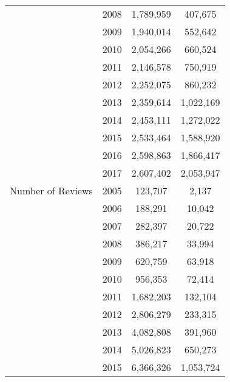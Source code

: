 \begin{table}[!htbp]
{\begin{tabular}{lccc}
                 & 2008                 & 1,789,959            & 407,675              \\
                 & 2009                 & 1,940,014            & 552,642              \\
                 & 2010                 & 2,054,266            & 660,524              \\
                 & 2011                 & 2,146,578            & 750,919              \\
                 & 2012                 & 2,252,075            & 860,232              \\
                 & 2013                 & 2,359,614            & 1,022,169            \\
                 & 2014                 & 2,453,111            & 1,272,022            \\
                 & 2015                 & 2,533,464            & 1,588,920            \\
                 & 2016                 & 2,598,863            & 1,866,417            \\
                 & 2017                 & 2,607,402            & 2,053,947            \\
Number of Reviews & 2005                & 123,707             & 2,137              \\
                 & 2006                 &  188,291            &  10,042            \\
                 & 2007                 &  282,397            &  20,722           \\
                 & 2008                 &  386,217             &  33,994           \\
                 & 2009                 &  620,759             & 63,918              \\
                 & 2010                 &  956,353             & 72,414              \\
                 & 2011                 &  1,682,203            & 132,104               \\
                 & 2012                 &  2,806,279          &   233,315           \\
                 & 2013                 &  4,082,808           &  391,960             \\
                 & 2014                 &  5,026,823           &  650,273            \\
                 & 2015                 &  6,366,326           &  1,053,724             \\

\end{tabular}}
\end{table}
